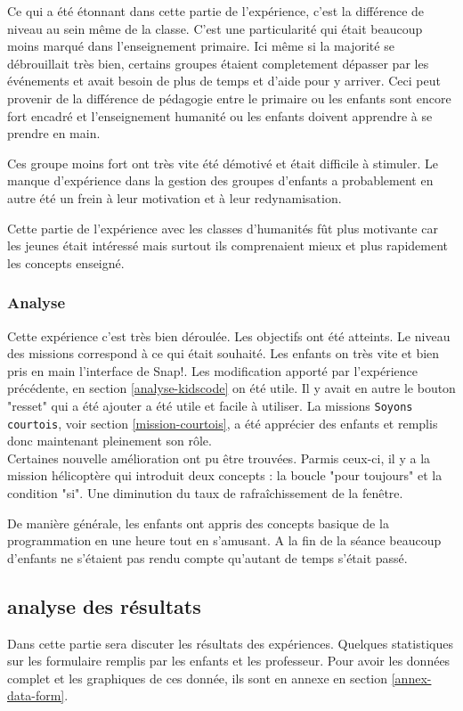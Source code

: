 Ce qui a été étonnant dans cette partie de l'expérience, c'est la différence de niveau au sein même de la classe. C'est une particularité qui était beaucoup moins marqué dans l'enseignement primaire. Ici même si la majorité se débrouillait très bien, certains groupes étaient completement dépasser par les événements et avait besoin de plus de temps et d'aide pour y arriver. Ceci peut provenir de la différence de pédagogie entre le primaire ou les enfants sont encore fort encadré et l'enseignement humanité ou les enfants doivent apprendre à se prendre en main.

Ces groupe moins fort ont très vite été démotivé et était difficile à stimuler. Le manque d'expérience dans la gestion des groupes d'enfants a probablement en autre été un frein à leur motivation et à leur redynamisation.

Cette partie de l'expérience avec les classes d'humanités fût plus motivante car les jeunes était intéressé mais surtout ils comprenaient mieux et plus rapidement les concepts enseigné.

\subsubsection{Analyse}
Cette expérience c'est très bien déroulée. Les objectifs ont été atteints. Le niveau des missions correspond à ce qui était souhaité. Les enfants on très vite et bien pris en main l'interface de Snap!. Les modification apporté par l'expérience précédente, en section \ref{analyse-kidscode} on été utile. Il y avait en autre le bouton "resset" qui a été ajouter a été utile et facile à utiliser. La missions \texttt{Soyons courtois}, voir section \ref{mission-courtois}, a été apprécier des enfants et remplis donc maintenant pleinement son rôle.\\

Certaines nouvelle amélioration ont pu être trouvées. Parmis ceux-ci, il y a la mission hélicoptère qui introduit deux concepts : la boucle "pour toujours" et la condition "si". Une diminution du taux de rafraîchissement de la fenêtre.

De manière générale, les enfants ont appris des concepts basique de la programmation en une heure tout en s'amusant. A la fin de la séance beaucoup d'enfants ne s'étaient pas rendu compte qu'autant de temps s'était passé.
\subsection{analyse des résultats}
Dans cette partie sera discuter les résultats des expériences. Quelques statistiques sur les formulaire remplis par les enfants et les professeur. Pour avoir les données complet et les graphiques de ces donnée, ils sont en annexe en section \ref{annex-data-form}.

